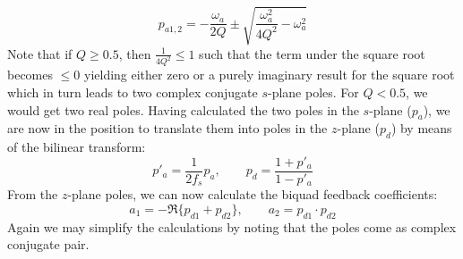 \begin{equation}
 p_{a1,2} = - \frac{\omega_a}{2Q} \pm \sqrt{\frac{\omega_a^2}{4 Q^2}-\omega_a^2}
\end{equation}
Note that if $Q \geq 0.5$, then $\frac{1}{4 Q^2} \leq 1$ such that the term under the square root becomes $\leq 0$ yielding either zero or a purely imaginary result for the square root which in turn leads to two complex conjugate $s$-plane poles. For $Q < 0.5$, we would get two real poles. Having calculated the two poles in the $s$-plane ($p_a$), we are now in the position to translate them into poles in the $z$-plane ($p_d$) by means of the bilinear transform:
\begin{equation}
 p'_a = \frac{1}{2 f_s} p_a, \qquad p_d = \frac{1+p'_a}{1-p'_a}
\end{equation}
From the $z$-plane poles, we can now calculate the biquad feedback coefficients:
\begin{equation}
 a_1 = - \Re \{ p_{d1}+p_{d2} \}, \qquad a_2 = p_{d1} \cdot p_{d2}
\end{equation}
Again we may simplify the calculations by noting that the poles come as complex conjugate pair.

